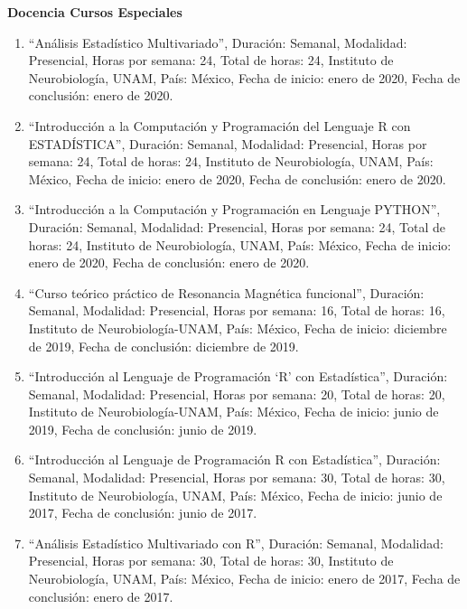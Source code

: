\textbf{Docencia Cursos Especiales}

\hfill

\begin{enumerate}

\item “Análisis Estadístico Multivariado”, Duración: Semanal, Modalidad: Presencial, Horas por semana: 24, Total de horas: 24, 
Instituto de Neurobiología, UNAM, País: México, Fecha de inicio: enero de 2020, Fecha de conclusión: enero de 2020.

\item “Introducción a la Computación y Programación del Lenguaje R con ESTADÍSTICA”, Duración: Semanal, Modalidad: Presencial, 
Horas por semana: 24, Total de horas: 24, Instituto de Neurobiología, UNAM, País: México, Fecha de inicio: enero de 2020, 
Fecha de conclusión: enero de 2020.

\item “Introducción a la Computación y Programación en Lenguaje PYTHON”, Duración: Semanal, Modalidad: Presencial, Horas por 
semana: 24, Total de horas: 24, Instituto de Neurobiología, UNAM, País: México, Fecha de inicio: enero de 2020, Fecha de 
conclusión: enero de 2020.

\item “Curso teórico práctico de Resonancia Magnética funcional”, Duración: Semanal, Modalidad: Presencial, Horas por semana: 16, Total de horas: 16, 
Instituto de Neurobiología-UNAM, País: México, Fecha 
de inicio: diciembre de 2019, Fecha de conclusión: diciembre de 2019.

\item “Introducción al Lenguaje de Programación ‘R’ con Estadística”, Duración: Semanal, Modalidad: Presencial, Horas por 
semana: 20, Total de horas: 20, Instituto de Neurobiología-UNAM, País: México, Fecha de inicio: junio de 2019, Fecha de 
conclusión: junio de 2019.

\item “Introducción al Lenguaje de Programación R con Estadística”, Duración: Semanal, Modalidad: Presencial, Horas por 
semana: 30, Total de horas: 30, Instituto de Neurobiología, UNAM, País: México, Fecha de inicio: junio de 2017, Fecha de 
conclusión: junio de 2017.

\item “Análisis Estadístico Multivariado con R”, Duración: Semanal, Modalidad: Presencial, Horas por semana: 30, Total de 
horas: 30, Instituto de Neurobiología, UNAM, País: México, Fecha de inicio: enero de 2017, Fecha de conclusión: enero de 
2017.


\end{enumerate}
